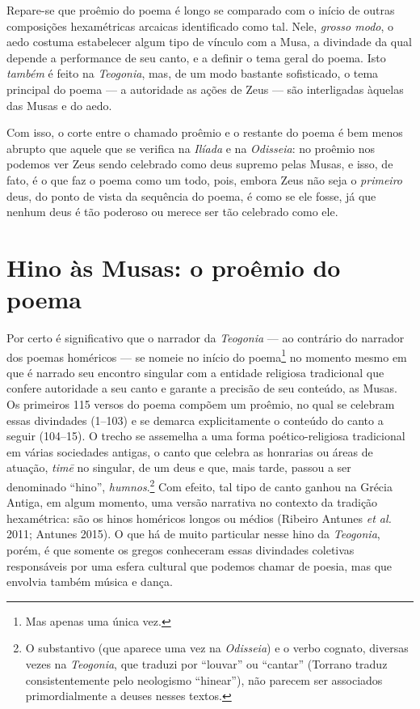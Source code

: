 Repare-se que proêmio do poema é longo se comparado com o início de
outras composições hexamétricas arcaicas identificado como tal. Nele,
\textit{grosso modo}, o aedo costuma estabelecer algum tipo de vínculo com
a Musa, a divindade da qual depende a performance de seu canto, e a
definir o tema geral do poema. Isto \textit{também} é feito na
\textit{Teogonia}, mas, de um modo bastante sofisticado, o tema principal
do poema --- a autoridade as ações de Zeus --- são interligadas àquelas
das Musas e do aedo.

Com isso, o corte entre o chamado proêmio e o restante do poema é bem
menos abrupto que aquele que se verifica na \textit{Ilíada} e na
\textit{Odisseia}: no proêmio nos podemos ver Zeus sendo celebrado como
deus supremo pelas Musas, e isso, de fato, é o que faz o poema como um
todo, pois, embora Zeus não seja o \textit{primeiro} deus, do ponto de
vista da sequência do poema, é como se ele fosse, já que nenhum deus é
tão poderoso ou merece ser tão celebrado como ele.

\section{Hino às Musas: o proêmio do poema}

Por certo é significativo que o narrador da \textit{Teogonia} --- ao
contrário do narrador dos poemas homéricos --- se nomeie no início do
poema\footnote{Mas apenas uma única vez.} no momento mesmo em que é narrado seu
encontro singular com a entidade religiosa tradicional que confere
autoridade a seu canto e garante a precisão de seu conteúdo, as Musas.
Os primeiros 115 versos do poema compõem um proêmio, no qual se celebram
essas divindades (1--103) e se demarca explicitamente o conteúdo do canto
a seguir (104--15). O trecho se assemelha a uma forma poético-religiosa
tradicional em várias sociedades antigas, o canto que celebra as
honrarias ou áreas de atuação, \textit{timē} no singular, de um deus e
que, mais tarde, passou a ser denominado ``hino'', \textit{humnos}.\footnote{O substantivo (que aparece uma vez na
  \textit{Odisseia}) e o verbo cognato, diversas vezes na
  \textit{Teogonia}, que traduzi por ``louvar'' ou ``cantar''
  (Torrano traduz consistentemente pelo neologismo ``hinear''), não
  parecem ser associados primordialmente a deuses nesses textos.} Com
efeito, tal tipo de canto ganhou na Grécia Antiga, em algum momento, uma
versão narrativa no contexto da tradição hexamétrica: são os hinos
homéricos longos ou médios (Ribeiro Antunes \textit{et al.} 2011; Antunes
2015). O que há de muito particular nesse hino da \textit{Teogonia},
porém, é que somente os gregos conheceram essas divindades coletivas
responsáveis por uma esfera cultural que podemos chamar de poesia, mas
que envolvia também música e dança.

